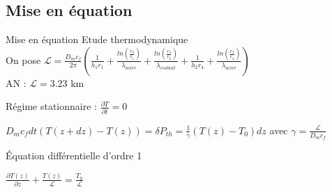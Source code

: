 \documentclass[hyperref={pdfpagelabels=false}]{beamer}
\begin{document}
\subsection*{Mise en équation}\label{t2}

\begin{frame}{Mise en équation}
Etude thermodynamique\\
On pose $\mathcal{L} = \frac{D_m c_f}{ 2 \pi} (\frac{1}{h_1  r_1} + \frac{ln(\frac{r_2}{r_1})}{ \lambda_{acier} } + \frac{ln(\frac{r_3}{r_2})}{ \lambda_{isolant} } + \frac{1}{ h_2  r_4} + \frac{ln(\frac{r_3}{r_4})}{ \lambda_{acier} })$ \\
 AN : $\mathcal{L} = 3.23$ km \par

Régime stationnaire : $ \frac{\partial T}{\partial t} = 0$ \par

$D_m c_f dt (T(z+dz) - T(z)) = \delta P_{th} = \frac{1}{\gamma} (T(z) - T_0 ) dz$ avec $\gamma =  \frac{\mathcal{L}}{D_m c_f}$ \par
\begin{exampleblock}{Équation différentielle d'ordre 1}
\begin{center}
$\frac{\partial T(z)}{\partial z}  + \frac{T(z)}{\mathcal{L}}= \frac{T_0}{\mathcal{L}}$
\end{center}
\end{exampleblock}
\end{frame}
\end{document}
